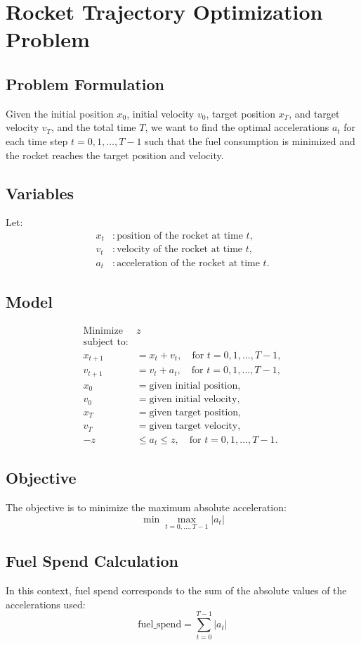 \documentclass{article}
\begin{document}
\section*{Rocket Trajectory Optimization Problem}

\subsection*{Problem Formulation}

Given the initial position \(x_0\), initial velocity \(v_0\), target position \(x_T\), and target velocity \(v_T\), and the total time \(T\), we want to find the optimal accelerations \(a_t\) for each time step \(t = 0, 1, \ldots, T-1\) such that the fuel consumption is minimized and the rocket reaches the target position and velocity.

\subsection*{Variables}

Let:
\begin{align*}
x_t & : \text{position of the rocket at time } t, \\
v_t & : \text{velocity of the rocket at time } t, \\
a_t & : \text{acceleration of the rocket at time } t.
\end{align*}

\subsection*{Model}

\begin{align*}
\text{Minimize } & z \\
\text{subject to:} \\
x_{t+1} &= x_t + v_t, \quad \text{for } t = 0, 1, \ldots, T-1, \\
v_{t+1} &= v_t + a_t, \quad \text{for } t = 0, 1, \ldots, T-1, \\
x_0 &= \text{given initial position}, \\
v_0 &= \text{given initial velocity}, \\
x_T &= \text{given target position}, \\
v_T &= \text{given target velocity}, \\
-z & \leq a_t \leq z, \quad \text{for } t = 0, 1, \ldots, T-1.
\end{align*}

\subsection*{Objective}

The objective is to minimize the maximum absolute acceleration:
\[
\min \max_{t=0,\ldots,T-1} |a_t|
\]

\subsection*{Fuel Spend Calculation}

In this context, fuel spend corresponds to the sum of the absolute values of the accelerations used:
\[
\text{fuel\_spend} = \sum_{t=0}^{T-1} |a_t|
\]
\end{document}
